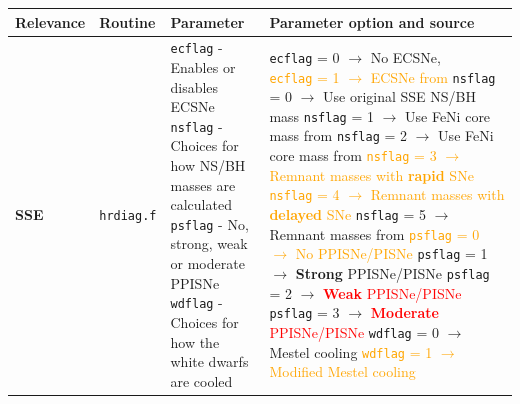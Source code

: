 	\begingroup
	\begin{landscape}
		\begin{table}
			\centering
			\begin{tabular}{|l|l|l|l|}
				\hline \textbf{Relevance} & \textbf{Routine} & \textbf{Parameter} & \textbf{Parameter option and source} \\
				\hline \hline \textbf{SSE} & \texttt{hrdiag.f} & \makecell[l]{\texttt{ecflag} - Enables or disables ECSNe \\ \texttt{nsflag} - Choices for how NS/BH masses are calculated \\ \texttt{psflag} - No, strong, weak or moderate PPISNe \\ \texttt{wdflag} - Choices for how the white dwarfs are cooled} & \makecell[l]{\texttt{ecflag} = 0 $\rightarrow$ No ECSNe, $\quad$ \textcolor{orange}{\texttt{ecflag} = 1 $\rightarrow$ ECSNe from} \cite{Belczynskietal2008} \\ \texttt{nsflag} =  0 $\rightarrow$ Use original SSE NS/BH mass \cite{Hurley2000} \\ \texttt{nsflag} = 1 $\rightarrow$ Use FeNi core mass from \cite{Belczynskietal2002} \\ \texttt{nsflag} = 2 $\rightarrow$ Use FeNi core mass from \cite{Belczynskietal2008} \\  \textcolor{orange}{\texttt{nsflag} = 3 $\rightarrow$ Remnant masses with \textbf{rapid} SNe} \cite{Fryeretal2012} \\   \textcolor{orange}{\texttt{nsflag} = 4 $\rightarrow$ Remnant masses with \textbf{delayed} SNe} \cite{Fryeretal2012} \\  \texttt{nsflag} = 5 $\rightarrow$ Remnant masses from \cite{EldridgeTout2004b}\\ \textcolor{orange}{\texttt{psflag} = 0 $\rightarrow$ No PPISNe/PISNe} \\ \texttt{psflag} = 1 $\rightarrow$ \textbf{Strong} PPISNe/PISNe \cite{Belczynskietal2016} \\ \texttt{psflag} = 2 $\rightarrow$ \textcolor{red}{\textbf{Weak} PPISNe/PISNe} \cite{Leungetal2019b,Leungetal2020c} \\ \texttt{psflag} = 3 $\rightarrow$ \textcolor{red}{\textbf{Moderate} PPISNe/PISNe} \cite{Leungetal2019b,Leungetal2020c} \\ \texttt{wdflag} = 0 $\rightarrow$ Mestel cooling \cite{Mestel1952a} \\ \textcolor{orange}{\texttt{wdflag} = 1 $\rightarrow$ Modified Mestel cooling} \cite{Toutetal1997}} \\

\end{tabular}
\end{table}
\end{landscape}
